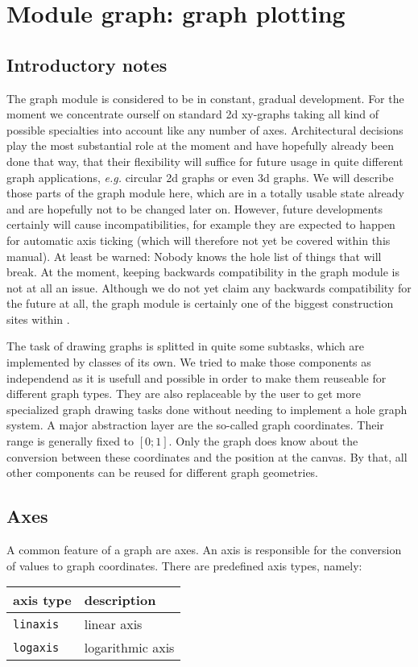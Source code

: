 \chapter{Module graph: graph plotting}
\label{graph}
\section{Introductory notes}

The graph module is considered to be in constant, gradual development.
For the moment we concentrate ourself on standard 2d xy-graphs taking
all kind of possible specialties into account like any number of axes.
Architectural decisions play the most substantial role at the moment
and have hopefully already been done that way, that their flexibility
will suffice for future usage in quite different graph applications,
\emph{e.g.} circular 2d graphs or even 3d graphs. We will describe
those parts of the graph module here, which are in a totally usable
state already and are hopefully not to be changed later on. However,
future developments certainly will cause incompatibilities, for
example they are expected to happen for automatic axis ticking (which
will therefore not yet be covered within this manual). At least be
warned: Nobody knows the hole list of things that will break. At the
moment, keeping backwards compatibility in the graph module is not at
all an issue. Although we do not yet claim any backwards compatibility
for the future at all, the graph module is certainly one of the
biggest construction sites within \PyX.

The task of drawing graphs is splitted in quite some subtasks, which
are implemented by classes of its own. We tried to make those
components as independend as it is usefull and possible in order to
make them reuseable for different graph types. They are also
replaceable by the user to get more specialized graph drawing tasks
done without needing to implement a hole graph system. A major
abstraction layer are the so-called graph coordinates. Their range is
generally fixed to $[0;1]$. Only the graph does know about the
conversion between these coordinates and the position at the canvas.
By that, all other components can be reused for different graph
geometries.

\section{Axes}
\label{graph:axes}

A common feature of a graph are axes. An axis is responsible for the
conversion of values to graph coordinates. There are predefined axis
types, namely:
\begin{center}
\begin{tabular}{ll}
axis type&description\\
\hline
\texttt{linaxis}&linear axis\\
\texttt{logaxis}&logarithmic axis\\
\end{tabular}
\end{center}

